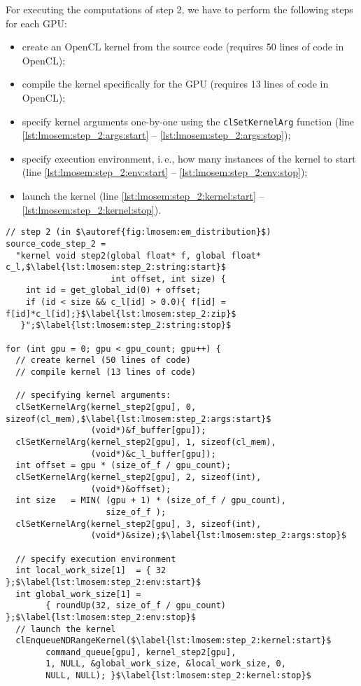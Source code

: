 For executing the computations of step 2, we have to perform the following steps for each GPU:
\begin{itemize}
  \item create an OpenCL kernel from the source code (requires 50 lines of code in OpenCL);
  \item compile the kernel specifically for the GPU (requires 13 lines of code in OpenCL);
  \item specify kernel arguments one-by-one using the \texttt{clSetKernelArg} function (line \autoref{lst:lmosem:step_2:args:start} -- \autoref{lst:lmosem:step_2:args:stop});
  \item specify execution environment, i.\,e., how many instances of the kernel to start (line \autoref{lst:lmosem:step_2:env:start} -- \autoref{lst:lmosem:step_2:env:stop});
  \item launch the kernel (line \autoref{lst:lmosem:step_2:kernel:start} -- \autoref{lst:lmosem:step_2:kernel:stop}).
\end{itemize}
\begin{lstlisting}[float,
  caption={Implementation of step 2 in OpenCL (omitting error checks for brevity)},
  label={lst:lmosem:step_2}]
// step 2 (in $\autoref{fig:lmosem:em_distribution}$)
source_code_step_2 =
  "kernel void step2(global float* f, global float* c_l,$\label{lst:lmosem:step_2:string:start}$
                     int offset, int size) {
    int id = get_global_id(0) + offset;
    if (id < size && c_l[id] > 0.0){ f[id] = f[id]*c_l[id];}$\label{lst:lmosem:step_2:zip}$
   }";$\label{lst:lmosem:step_2:string:stop}$

for (int gpu = 0; gpu < gpu_count; gpu++) {
  // create kernel (50 lines of code)
  // compile kernel (13 lines of code)

  // specifying kernel arguments:
  clSetKernelArg(kernel_step2[gpu], 0, sizeof(cl_mem),$\label{lst:lmosem:step_2:args:start}$
                 (void*)&f_buffer[gpu]);
  clSetKernelArg(kernel_step2[gpu], 1, sizeof(cl_mem),
                 (void*)&c_l_buffer[gpu]);
  int offset = gpu * (size_of_f / gpu_count);
  clSetKernelArg(kernel_step2[gpu], 2, sizeof(int),
                 (void*)&offset);
  int size   = MIN( (gpu + 1) * (size_of_f / gpu_count),
                    size_of_f );
  clSetKernelArg(kernel_step2[gpu], 3, sizeof(int),
                 (void*)&size);$\label{lst:lmosem:step_2:args:stop}$

  // specify execution environment
  int local_work_size[1]  = { 32 };$\label{lst:lmosem:step_2:env:start}$
  int global_work_size[1] =
        { roundUp(32, size_of_f / gpu_count) };$\label{lst:lmosem:step_2:env:stop}$
  // launch the kernel
  clEnqueueNDRangeKernel($\label{lst:lmosem:step_2:kernel:start}$
        command_queue[gpu], kernel_step2[gpu],
        1, NULL, &global_work_size, &local_work_size, 0,
        NULL, NULL); }$\label{lst:lmosem:step_2:kernel:stop}$
\end{lstlisting}



